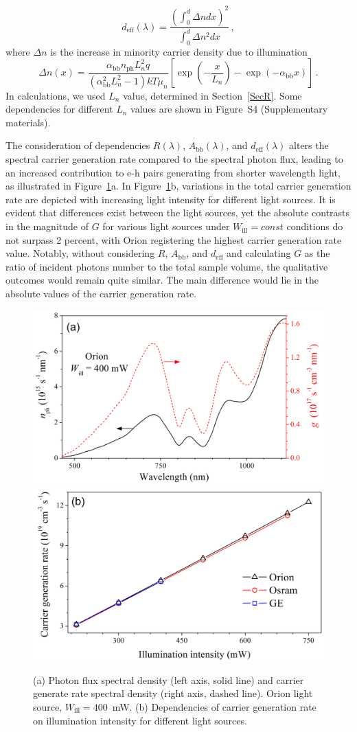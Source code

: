 \documentclass{WileyMSP-template}
\begin{document}
\begin{equation}
\label{eqdeff}
d_\mathrm{eff}(\lambda)=\frac{\left(\int_0^d \Delta n dx\right)^2}{\int_0^d \Delta n^2 dx}\,,
\end{equation}
where
$\Delta n$ is the increase in minority carrier density due to illumination
\begin{equation}
\label{eqdeln}
\Delta n (x)=\frac{\alpha_\mathrm{bb} n_\mathrm{ph} L_n^2 q}{(\alpha_\mathrm{bb}^2 L_n^2-1)kT\mu_n}
\left[\exp\left(-\frac{x}{L_n}\right)-\exp\left(-\alpha_\mathrm{bb} x\right)\right]\,.
\end{equation}
In calculations, we used $L_n$ value, determined in Section~\ref{SecR}. 
Some dependencies for different $L_n$ values are shown in Figure~S4 (Supplementary materials). 

The consideration of dependencies $R(\lambda)$, $A_\mathrm{bb}(\lambda)$, and $d_\mathrm{eff}(\lambda)$ alters 
the spectral carrier generation rate compared to the spectral photon flux, 
leading to an increased contribution to e-h pairs generating from shorter wavelength light, 
as illustrated in Figure~\ref{fig5}a. 
In Figure~\ref{fig5}b, variations in the total carrier generation rate are depicted with increasing light intensity for different light sources. 
It is evident that differences exist between the light sources, 
yet the absolute contrasts in the magnitude of $G$ for various light sources under $W_\mathrm{ill}=const$ conditions do not surpass 2 percent, 
with Orion registering the highest carrier generation rate value. 
Notably, without considering $R$, $A_\mathrm{bb}$, and $d_\mathrm{eff}$ and calculating $G$  as the ratio of incident photons number 
to the total sample volume, the qualitative outcomes would remain quite similar. The main difference would lie in the absolute values of the carrier generation rate.

\begin{figure}
\centering
  \includegraphics[width=0.4\linewidth]{Fig5a.png}
  \includegraphics[width=0.4\linewidth]{Fig5b.png}
  \caption{
  (a) Photon flux spectral density (left axis, solid line) and carrier generate rate spectral density (right axis, dashed line).
  Orion light source, $W_\mathrm{ill}=400$~mW.
  (b) Dependencies of carrier generation rate on illumination intensity for different light sources.
  }
  \label{fig5}
\end{figure}
\end{document}
